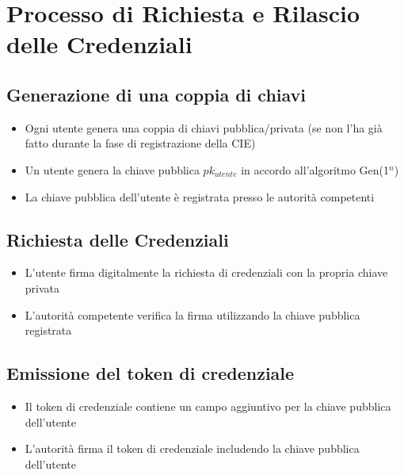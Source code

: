     \section{Processo di Richiesta e Rilascio delle Credenziali}
    
        \subsection{Generazione di una coppia di chiavi}
            \begin{itemize}
                \item Ogni utente genera una coppia di chiavi pubblica/privata (se non l'ha già fatto durante la fase di registrazione della CIE)

                \item Un utente genera la chiave pubblica $pk_{utente}$ in accordo all'algoritmo Gen(1$^n$)
                
                \item La chiave pubblica dell'utente è registrata presso le autorità competenti
            \end{itemize}
    
        \subsection{Richiesta delle Credenziali}
            \begin{itemize}
                \item  L'utente firma digitalmente la richiesta di credenziali con la propria chiave privata
                
                \item L'autorità competente verifica la firma utilizzando la chiave pubblica registrata
            \end{itemize}

        \subsection{Emissione del token di credenziale}
            \begin{itemize}
                \item Il token di credenziale contiene un campo aggiuntivo per la chiave pubblica dell'utente
                
                \item L'autorità firma il token di credenziale includendo la chiave pubblica dell'utente
            \end{itemize}


